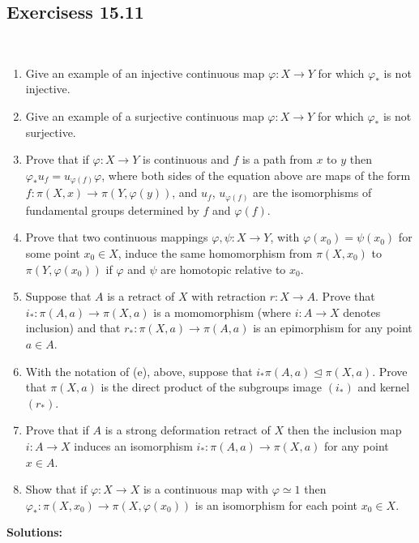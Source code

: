 \documentclass{fkbook}
\theoremstyle{snazzydefinition}
\begin{document}
\begin{adjustwidth}{1em}{}
  \subsection{Exercisess 15.11}~
  \begin{leftbar}
    \begin{enumerate}
     \item Give an example of an injective continuous map $\varphi : X
       \to Y$ for which $\varphi_*$ is not injective.
     \item Give an example of a surjective continuous map $\varphi : X
       \to Y$ for which $\varphi_*$ is not surjective.
     \item Prove that if $\varphi : X \to Y$ is continuous and $f$ is
       a path from $x$ to $y$ then $\varphi_* u_f = u_{\varphi(f)}
       \varphi$, where both sides of the equation above are maps of
       the form $f : \pi(X,x) \to \pi(Y, \varphi(y))$, and $u_f$,
       $u_{\varphi(f)}$ are the isomorphisms of fundamental groups
       determined by $f$ and $\varphi(f)$.
     \item Prove that two continuous mappings $\varphi, \psi : X \to
       Y$, with $\varphi(x_0) = \psi(x_0)$ for some point $x_0 \in X$,
       induce the same homomorphism from $\pi(X,x_0)$ to $\pi(Y,
       \varphi(x_0))$ if $\varphi$ and $\psi$ are homotopic relative
       to $x_0$.
     \item Suppose that $A$ is a retract of $X$ with retraction $r : X
       \to A$. Prove that $i_* : \pi(A,a) \to \pi(X,a)$ is a
       momomorphism (where $i : A \to X$ denotes inclusion) and that
       $r_* : \pi(X,a) \to \pi(A,a)$ is an epimorphism for any point
       $a \in A$.
     \item With the notation of (e), above, suppose that $i_*
       \pi(A,a) \trianglelefteq \pi(X,a)$. Prove that $\pi(X,a)$ is
       the direct product of the subgroups image $(i_*)$ and kernel
       $(r_*)$.
     \item Prove that if $A$ is a strong deformation retract of $X$
       then the inclusion map $i : A \to X$ induces an isomorphism
       $i_* : \pi(A,a) \to \pi(X,a)$ for any point $x \in A$.
     \item Show that if $\varphi : X \to X$ is a continuous map with
       $\varphi \simeq 1$ then $\varphi_* : \pi(X,x_0) \to \pi(X,
       \varphi(x_0))$ is an isomorphism for each point $x_0 \in X$.
    \end{enumerate}
  \end{leftbar}
  \textbf{Solutions:}
  \begin{enumerate}

\end{enumerate}
\end{adjustwidth}
\end{document}
